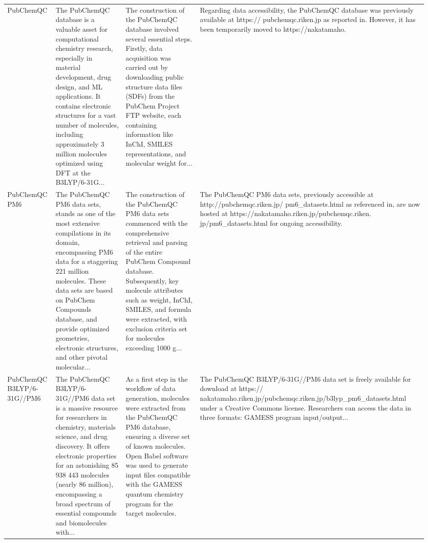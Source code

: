\documentclass[12pt]{article}
\begin{document}
\begin{longtable}{p{}p{}p{}p{}}
PubChemQC \cite{ds13-28} & The PubChemQC database is a valuable asset for computational chemistry research, especially in material development, drug design, and ML applications. It contains electronic structures for a vast number of molecules, including approximately 3 million molecules optimized using DFT at the B3LYP/6-31G... & The construction of the PubChemQC database involved several essential steps. Firstly, data acquisition was carried out by downloading public structure data files (SDFs) from the PubChem Project FTP website, each containing information like InChI, SMILES representations, and molecular weight for... & Regarding data accessibility, the PubChemQC database was previously available at https:// pubchemqc.riken.jp as reported in. However, it has been temporarily moved to https://nakatamaho. \cite{ds13-28} \\
PubChemQC PM6 \cite{ds14-29} & The PubChemQC PM6 data sets, stands as one of the most extensive compilations in its domain, encompassing PM6 data for a staggering 221 million molecules. These data sets are based on PubChem Compounds database, and provide optimized geometries, electronic structures, and other pivotal molecular... & The construction of the PubChemQC PM6 data sets commenced with the comprehensive retrieval and parsing of the entire PubChem Compound database. Subsequently, key molecule attributes such as weight, InChI, SMILES, and formula were extracted, with exclusion criteria set for molecules exceeding 1000 g... & The PubChemQC PM6 data sets, previously accessible at http://pubchemqc.riken.jp/ pm6\_datasets.html as referenced in, are now hosted at https://nakatamaho.riken.jp/pubchemqc.riken. jp/pm6\_datasets.html for ongoing accessibility. \cite{ds14-29} \\
PubChemQC B3LYP/6-31G//PM6 \cite{ds15-27} & The PubChemQC B3LYP/6-31G//PM6 data set is a massive resource for researchers in chemistry, materials science, and drug discovery. It offers electronic properties for an astonishing 85 938 443 molecules (nearly 86 million), encompassing a broad spectrum of essential compounds and biomolecules with... & As a first step in the workflow of data generation, molecules were extracted from the PubChemQC PM6 database, ensuring a diverse set of known molecules. Open Babel software was used to generate input files compatible with the GAMESS quantum chemistry program for the target molecules. & The PubChemQC B3LYP/6-31G//PM6 data set is freely available for download at https:// nakatamaho.riken.jp/pubchemqc.riken.jp/b3lyp\_pm6\_datasets.html under a Creative Commons license. Researchers can access the data in three formats: GAMESS program input/output... \cite{ds15-105} \\

\end{longtable}
\end{document}
